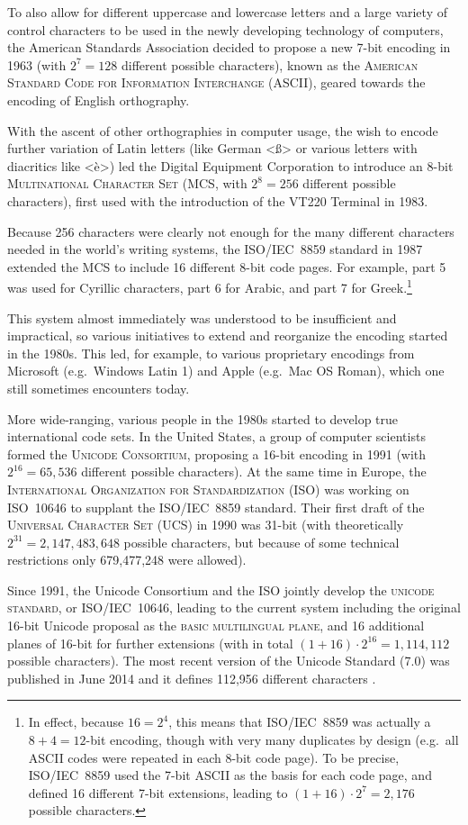 To also allow for different uppercase and lowercase letters and a large variety of control characters to be used in the newly developing technology of computers, the American Standards Association decided to propose a new 7-bit encoding in 1963 (with $2^7 = 128$ different possible characters), known as the \textsc{American Standard Code for Information Interchange} (ASCII), geared towards the encoding of English orthography. 

With the ascent of other orthographies in computer usage, the wish to encode further variation of Latin letters (like German <ß> or various letters with diacritics like <è>) led the Digital Equipment Corporation to introduce an 8-bit \textsc{Multinational Character Set} (MCS, with $2^8 = 256$ different possible characters), first used with the introduction of the {\small VT}220 Terminal in 1983. 

Because 256 characters were clearly not enough for the many different characters needed in the world's writing systems, the ISO/IEC~8859 standard in 1987 extended the MCS to include 16 different 8-bit code pages. For example, part 5 was used for Cyrillic characters, part 6 for Arabic, and part 7 for Greek.\footnote{In effect, because $16 = 2^4$, this means that ISO/IEC~8859 was actually a $8+4=12$-bit encoding, though with very many duplicates by design (e.g.~all ASCII codes were repeated in each 8-bit code page). To be precise, ISO/IEC~8859 used the 7-bit ASCII as the basis for each code page, and defined 16 different 7-bit extensions, leading to $(1+16)\cdot{2^7} = 2,176$ possible characters.}

This system almost immediately was understood to be insufficient and impractical, so various initiatives to extend and reorganize the encoding started in the 1980s. This led, for example, to various proprietary encodings from Microsoft (e.g.~Windows Latin 1) and Apple (e.g.~Mac OS Roman), which one still sometimes encounters today. 

More wide-ranging, various people in the 1980s started to develop true international code sets. In the United States, a group of computer scientists formed the \textsc{Unicode Consortium}, proposing a 16-bit encoding in 1991 (with $2^{16} = 65,536$ different possible characters). At the same time in Europe, the \textsc{International Organization for Standardization} (ISO) was working on ISO~10646 to supplant the ISO/IEC~8859 standard. Their first draft of the \textsc{Universal Character Set} (UCS) in 1990 was 31-bit (with theoretically $2^{31} = 2,147,483,648$ possible characters, but because of some technical restrictions only 679,477,248 were allowed). 

Since 1991, the Unicode Consortium and the ISO jointly develop the \textsc{unicode standard}, or ISO/IEC~10646, leading to the current system including the original 16-bit Unicode proposal as the \textsc{basic multilingual plane}, and 16 additional planes of 16-bit for further extensions (with in total $(1+16) \cdot 2^{16} = 1,114,112$ possible characters). The most recent version of the Unicode Standard (7.0) was published in June 2014 and it defines 112,956 different characters \citep{Unicode2014}.
